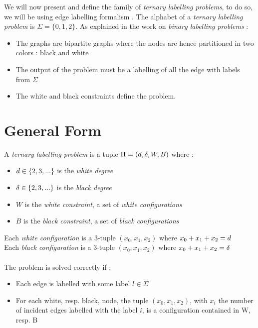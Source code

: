 We will now present and define the family of \textit{ternary labelling problems}, to do so, we will be using edge labelling formalism \cite{1,LB_MM}.
The alphabet of a \textit{ternary labelling problem} is $\Sigma = \{0,1,2\}$.
As explained in the work on \textit{binary labelling problems} \cite{1}:
\begin{itemize}
    \item The graphs are bipartite graphs where the nodes are hence partitioned in two colors : black and white
    \item The output of the problem must be a labelling of all the edge with labels from $\Sigma$
    \item The white and black constraints define the problem.
\end{itemize}
\section{General Form}\label{section:general}
A \textit{ternary labelling problem} is a tuple $\Pi = (d,\delta,W,B)$ where :
\begin{itemize}
    \item $d\in\{2,3,...\}$ is the \textit{white degree}
    \item $\delta\in\{2,3,...\}$ is the \textit{black degree}
    \item $W$ is the \textit{white constraint}, a set of \textit{white configurations}
    \item $B$ is the \textit{black constraint}, a set of \textit{black configurations}
\end{itemize}
Each \textit{white configuration} is a 3-tuple $(x_0,x_1,x_2)$ where $x_0+x_1+x_2 = d$\\
Each \textit{black configuration} is a 3-tuple $(x_0,x_1,x_2)$ where $x_0+x_1+x_2 = \delta$\\\\
The problem is solved correctly if :
\begin{itemize}
    \item Each edge is labelled with some label $l\in\Sigma$
    \item For each white, resp. black, node, the tuple $(x_0,x_1,x_2)$, with $x_i$ the number of incident edges labelled with the label $i$, is a configuration contained in W, resp. B
\end{itemize}

